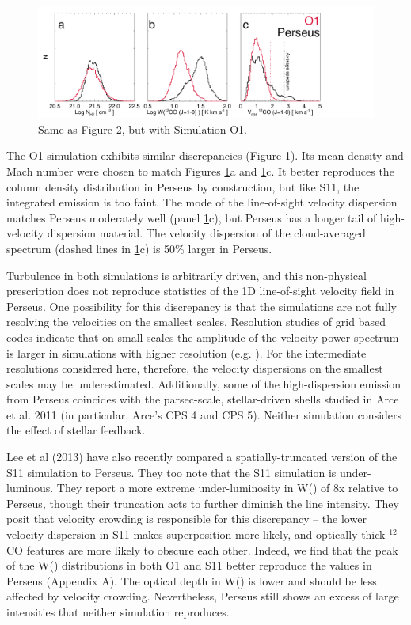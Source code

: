 \begin{figure}[htbp]
\centering
\includegraphics[width=7in]{figures/stella_diagnostic}
\caption{Same as Figure 2, but with Simulation O1.}
\label{fig:diagnostic_stella}
\end{figure}


The O1 simulation exhibits similar discrepancies (Figure \ref{fig:diagnostic_stella}). Its mean density and Mach number were
chosen to match Figures \ref{fig:diagnostic_stella}a and \ref{fig:diagnostic_stella}c. It better
reproduces the column density distribution in Perseus by construction, but like S11, the integrated emission is too faint.
The mode of the line-of-sight velocity
dispersion matches Perseus moderately well (panel \ref{fig:diagnostic_stella}c), but Perseus has a longer
tail of high-velocity dispersion material. The velocity dispersion of the cloud-averaged spectrum (dashed lines in \ref{fig:diagnostic_stella}c)
is 50\% larger in Perseus.

Turbulence in both simulations is arbitrarily driven, and this non-physical prescription does not reproduce statistics of the 1D line-of-sight velocity field in Perseus. One possibility for this discrepancy is that the simulations are not fully resolving the velocities on the smallest scales.  Resolution studies of grid based codes indicate that on small scales the amplitude of the velocity power spectrum is larger in simulations with higher resolution (e.g. \citealt{http://adsabs.harvard.edu/abs/2003ApJ...590..858V}).  For the intermediate resolutions considered here, therefore, the velocity dispersions on the smallest scales may be underestimated.  Additionally, some of the high-dispersion emission from Perseus coincides with the parsec-scale, stellar-driven shells studied in Arce et al. 2011 (in particular, Arce's CPS 4 and CPS 5). Neither simulation considers the effect of stellar feedback.

Lee et al (2013) have also recently compared a spatially-truncated version of the S11 simulation to Perseus. They too note that the S11 simulation
is under-luminous. They report a more extreme under-luminosity in W(\coa) of 8x relative to Perseus,
though their truncation acts to further diminish the line intensity. They posit that velocity crowding is responsible for this discrepancy --
the lower velocity dispersion in S11 makes superposition more likely, and optically thick $^{12}$CO features are more likely
to obscure each other. Indeed, we find that the peak of the W(\coc) distributions in both O1 and S11 better reproduce the values in Perseus (Appendix A).
The optical depth in W(\coc) is lower and should be less affected by velocity crowding. Nevertheless, Perseus still shows an excess of
large \coc\, intensities that neither simulation reproduces.

